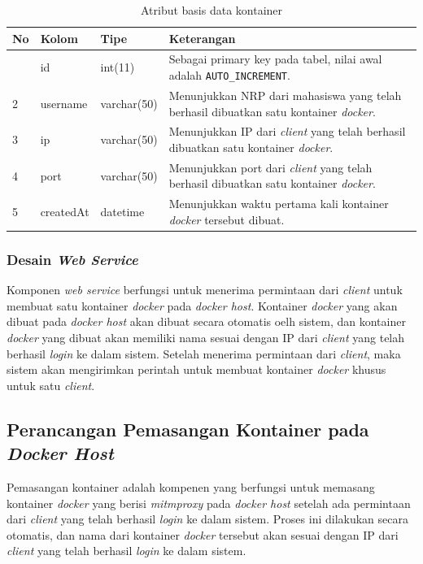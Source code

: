 \begin{longtable}{|p{}|p{}|p{}|p{}|}
	\caption{Atribut basis data kontainer} \label{tabelkontainer} \\
	\hline
	\textbf{No} & \textbf{Kolom} & \textbf{Tipe} & \textbf{Keterangan} \\ \hline
	\endhead
	\endfoot
	\endlastfoot
	1 & id & int(11) & Sebagai primary key pada tabel, nilai awal adalah \texttt{AUTO\_INCREMENT}. \\ \hline
	2 & username & varchar(50) & Menunjukkan NRP dari mahasiswa yang telah berhasil dibuatkan satu kontainer \textit{docker}. \\ \hline
	3 & ip & varchar(50) & Menunjukkan IP dari \textit{client} yang telah berhasil dibuatkan satu kontainer \textit{docker}. \\ \hline
	4 & port & varchar(50) & Menunjukkan port dari \textit{client} yang telah berhasil dibuatkan satu kontainer \textit{docker}. \\ \hline
	5 & createdAt & datetime & Menunjukkan waktu pertama kali kontainer \textit{docker} tersebut dibuat. \\ \hline
	
\end{longtable}


\subsubsection{Desain \textit{Web Service}}
Komponen \textit{web service} berfungsi untuk menerima permintaan dari \textit{client} untuk membuat satu kontainer \textit{docker} pada \textit{docker host}. Kontainer \textit{docker} yang akan dibuat pada \textit{docker host} akan dibuat secara otomatis oelh sistem, dan kontainer \textit{docker} yang dibuat akan memiliki nama sesuai dengan IP dari \textit{client} yang telah berhasil \textit{login} ke dalam sistem. Setelah menerima permintaan dari \textit{client}, maka sistem akan mengirimkan perintah untuk membuat kontainer \textit{docker} khusus untuk satu \textit{client}. 

\subsection{Perancangan Pemasangan Kontainer pada \textit{Docker Host}}
Pemasangan kontainer adalah kompenen yang berfungsi untuk memasang kontainer \textit{docker} yang berisi \textit{mitmproxy} pada \textit{docker host} setelah ada permintaan dari \textit{client} yang telah berhasil \textit{login} ke dalam sistem. Proses ini dilakukan secara otomatis, dan nama dari kontainer \textit{docker} tersebut akan sesuai dengan IP dari \textit{client} yang telah berhasil \textit{login} ke dalam sistem.

